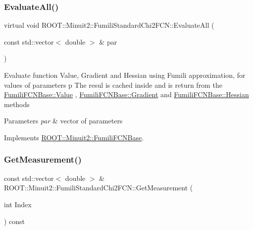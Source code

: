 \subsubsection{\texorpdfstring{EvaluateAll()}{EvaluateAll()}\hspace{0.1cm}{\footnotesize\ttfamily [3/3]}}
{\footnotesize\ttfamily virtual void R\+O\+O\+T\+::\+Minuit2\+::\+Fumili\+Standard\+Chi2\+F\+C\+N\+::\+Evaluate\+All (\begin{DoxyParamCaption}\item[{const std\+::vector$<$ double $>$ \&}]{par }\end{DoxyParamCaption})\hspace{0.3cm}{\ttfamily [virtual]}}

Evaluate function Value, Gradient and Hessian using Fumili approximation, for values of parameters p The resul is cached inside and is return from the \mbox{\hyperlink{classROOT_1_1Minuit2_1_1FumiliFCNBase_a221dacee0ccde747a271a0cecd759f98}{Fumili\+F\+C\+N\+Base\+::\+Value}} , \mbox{\hyperlink{classROOT_1_1Minuit2_1_1FumiliFCNBase_ad226939ea2e83f754b5a6afc30876d3e}{Fumili\+F\+C\+N\+Base\+::\+Gradient}} and \mbox{\hyperlink{classROOT_1_1Minuit2_1_1FumiliFCNBase_ade134d8c6613393e942ef98d445db376}{Fumili\+F\+C\+N\+Base\+::\+Hessian}} methods


\begin{DoxyParams}{Parameters}
{\em par} & vector of parameters \\
\hline
\end{DoxyParams}


Implements \mbox{\hyperlink{classROOT_1_1Minuit2_1_1FumiliFCNBase_a0741bb4a7405cc33ab60583472a189cb}{R\+O\+O\+T\+::\+Minuit2\+::\+Fumili\+F\+C\+N\+Base}}.

\mbox{\label{classROOT_1_1Minuit2_1_1FumiliStandardChi2FCN_aed6181ee2996e090bc4aeb267771390e}} 
\subsubsection{\texorpdfstring{GetMeasurement()}{GetMeasurement()}\hspace{0.1cm}{\footnotesize\ttfamily [1/3]}}
{\footnotesize\ttfamily const std\+::vector$<$ double $>$ \& R\+O\+O\+T\+::\+Minuit2\+::\+Fumili\+Standard\+Chi2\+F\+C\+N\+::\+Get\+Measurement (\begin{DoxyParamCaption}\item[{int}]{Index }\end{DoxyParamCaption}) const\hspace{0.3cm}{\ttfamily [virtual]}}

